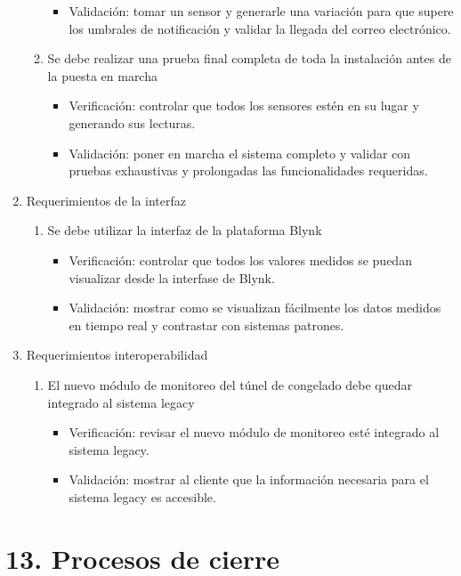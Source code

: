 \documentclass[
11pt, %
]{charter}
\begin{document}
\begin{enumerate}
\begin{enumerate}
\begin{itemize}
				\item Validación: tomar un sensor y generarle una variación para que supere los umbrales de notificación y validar la llegada del correo electrónico.
			\end{itemize}
			\item Se debe realizar una prueba final completa de toda la instalación antes de la puesta en marcha
			\begin{itemize}
				\item Verificación: controlar que todos los sensores estén en su lugar y generando sus lecturas.
				\item Validación: poner en marcha el sistema completo y validar con pruebas exhaustivas y prolongadas las funcionalidades requeridas.
			\end{itemize}
		\end{enumerate}
	\item Requerimientos de la interfaz
		\begin{enumerate}		
			\item Se debe utilizar la interfaz de la plataforma Blynk
			\begin{itemize}
				\item Verificación: controlar que todos los valores medidos se puedan visualizar desde la interfase de Blynk.
				\item Validación: mostrar como se visualizan fácilmente los datos medidos en tiempo real y contrastar con sistemas patrones.
			\end{itemize}
		\end{enumerate}
	\item Requerimientos interoperabilidad
		\begin{enumerate}		
			\item El nuevo módulo de monitoreo del túnel de congelado debe quedar integrado al sistema legacy
			\begin{itemize}
				\item Verificación: revisar el nuevo módulo de monitoreo esté integrado al sistema legacy.
				\item Validación: mostrar al cliente que la información necesaria para el sistema legacy es accesible.
			\end{itemize}
		\end{enumerate}
\end{enumerate}

\section{13. Procesos de cierre}    
\label{sec:cierre}
\end{document}
